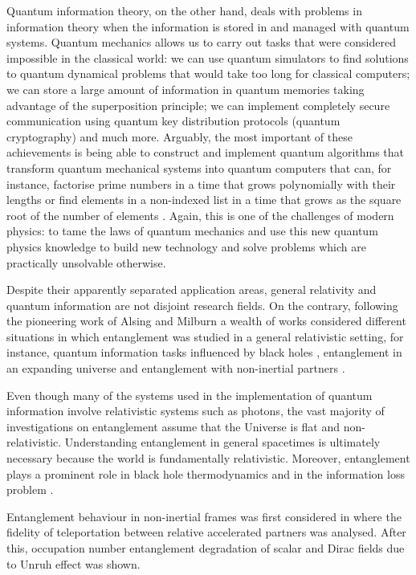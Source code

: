 Quantum information theory, on the other hand, deals with problems in information theory when the information is stored in and managed with quantum systems. Quantum mechanics allows us to carry out tasks that were considered impossible in the classical world: we can use quantum simulators to find solutions to quantum dynamical problems that would take too long for classical computers; we can store a large amount of information in quantum memories taking advantage of the superposition principle; we can implement completely secure communication using quantum key distribution protocols (quantum cryptography) and much more. Arguably, the most important of these achievements is being able to construct and implement quantum algorithms that transform quantum mechanical systems into quantum computers that can, for instance, factorise prime numbers in a time that grows polynomially with their lengths \cite{Shor} or find elements in a non-indexed list in a time that grows as the square root of the number of elements \cite{Grover}. Again, this is one of the challenges of modern physics: to tame the laws of quantum mechanics and use this new quantum physics knowledge to build new technology and solve problems which are practically unsolvable otherwise.

Despite their apparently separated application areas, general relativity and quantum information are not disjoint research fields. On the contrary, following the pioneering work of Alsing and Milburn \cite{Alsingtelep} a wealth of works considered different situations in which entanglement was studied in a general relativistic setting, for instance, quantum information tasks influenced by black holes  \cite{TeraUedaSpd,PanBlackHoles,ManSchullBlack,Adeschul}, entanglement in an expanding universe \cite{caball,Steeg} and entanglement with non-inertial partners \cite{Alicefalls,AlsingSchul,TeraUeda2,KBr}.

Even though many of
the systems used in the implementation of quantum information
involve relativistic systems such as photons, the vast majority of
investigations on entanglement assume that the Universe is flat and
non-relativistic. Understanding entanglement in general spacetimes is
ultimately necessary because the world is fundamentally
relativistic. Moreover, entanglement  plays a prominent
role in black hole thermodynamics \cite{bombelli,Canent,Terashima,Emparan,levay,Cadoni,Hu2,NavarroSalas} and in the
information loss problem \cite{Maldacena,Preskill,Lloyd2,Ahn1,ManSchullBlack}.


Entanglement behaviour in non-inertial frames was first considered in \cite{Alsingtelep} where the fidelity of teleportation between relative accelerated partners was analysed. After this, occupation number entanglement degradation of scalar \cite{Alicefalls} and Dirac \cite{AlsingSchul} fields due to Unruh effect was shown. 

